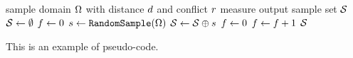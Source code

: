 \begin{algorithm}
  \begin{algorithmic}[1]
    \REQUIRE sample domain $\Omega$ with distance $d$ and conflict $r$ measure
    \ENSURE output sample set $\mathcal{S}{}$
    \STATE $\mathcal{S}{} \leftarrow \emptyset$
    \STATE $f \leftarrow 0$ 
    \STATE $s{} \leftarrow \texttt{RandomSample}(\Omega)$
    \IF{$\dist(\sample, \sampleprime) < \conflictdist(\sample, \sampleprime) \; \forall \sampleprime \in \sampleset$}
    \STATE $\mathcal{S}{} \leftarrow \mathcal{S}{} \oplus s{}$ 
    \STATE $f \leftarrow 0$
    \ELSE
    \STATE $f \leftarrow f + 1$
    \ENDIF
    \ENDWHILE
    \RETURN{} $\mathcal{S}{}$
  \end{algorithmic}
  {%
This is an example of pseudo-code.
  }
  \label{alg:dart_throw}
\end{algorithm}
